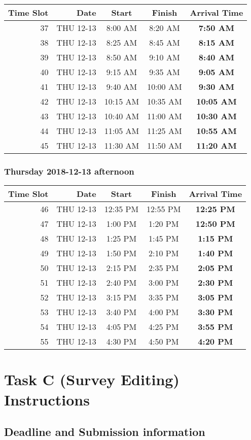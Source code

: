 \documentclass[]{book}
\theoremstyle{definition}
\theoremstyle{definition}
\theoremstyle{definition}
\theoremstyle{remark}
\begin{document}
\begin{longtable}[]{@{}rrccc@{}}
\toprule
Time Slot & Date & Start & Finish & \textbf{Arrival Time}\tabularnewline
\midrule
\endhead
37 & THU 12-13 & 8:00 AM & 8:20 AM & \textbf{7:50 AM}\tabularnewline
38 & THU 12-13 & 8:25 AM & 8:45 AM & \textbf{8:15 AM}\tabularnewline
39 & THU 12-13 & 8:50 AM & 9:10 AM & \textbf{8:40 AM}\tabularnewline
40 & THU 12-13 & 9:15 AM & 9:35 AM & \textbf{9:05 AM}\tabularnewline
41 & THU 12-13 & 9:40 AM & 10:00 AM & \textbf{9:30 AM}\tabularnewline
42 & THU 12-13 & 10:15 AM & 10:35 AM & \textbf{10:05 AM}\tabularnewline
43 & THU 12-13 & 10:40 AM & 11:00 AM & \textbf{10:30 AM}\tabularnewline
44 & THU 12-13 & 11:05 AM & 11:25 AM & \textbf{10:55 AM}\tabularnewline
45 & THU 12-13 & 11:30 AM & 11:50 AM & \textbf{11:20 AM}\tabularnewline
\bottomrule
\end{longtable}

\hypertarget{thursday-2018-12-13-afternoon}{%
\subsection{Thursday 2018-12-13
afternoon}\label{thursday-2018-12-13-afternoon}}

\begin{longtable}[]{@{}rrccc@{}}
\toprule
Time Slot & Date & Start & Finish & \textbf{Arrival Time}\tabularnewline
\midrule
\endhead
46 & THU 12-13 & 12:35 PM & 12:55 PM & \textbf{12:25 PM}\tabularnewline
47 & THU 12-13 & 1:00 PM & 1:20 PM & \textbf{12:50 PM}\tabularnewline
48 & THU 12-13 & 1:25 PM & 1:45 PM & \textbf{1:15 PM}\tabularnewline
49 & THU 12-13 & 1:50 PM & 2:10 PM & \textbf{1:40 PM}\tabularnewline
50 & THU 12-13 & 2:15 PM & 2:35 PM & \textbf{2:05 PM}\tabularnewline
51 & THU 12-13 & 2:40 PM & 3:00 PM & \textbf{2:30 PM}\tabularnewline
52 & THU 12-13 & 3:15 PM & 3:35 PM & \textbf{3:05 PM}\tabularnewline
53 & THU 12-13 & 3:40 PM & 4:00 PM & \textbf{3:30 PM}\tabularnewline
54 & THU 12-13 & 4:05 PM & 4:25 PM & \textbf{3:55 PM}\tabularnewline
55 & THU 12-13 & 4:30 PM & 4:50 PM & \textbf{4:20 PM}\tabularnewline
\bottomrule
\end{longtable}

\hypertarget{taskC}{%
\chapter{Task C (Survey Editing) Instructions}\label{taskC}}

\hypertarget{deadline-and-submission-information-2}{%
\section{Deadline and Submission
information}\label{deadline-and-submission-information-2}}
\end{document}

